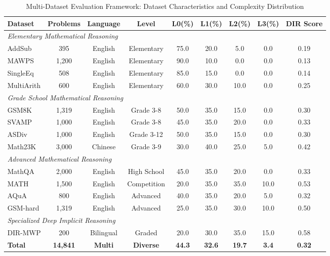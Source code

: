 \begin{table*}[htbp]
\caption{Multi-Dataset Evaluation Framework: Dataset Characteristics and Complexity Distribution}
\label{tab:dataset_framework}
\centering
\small
\begin{tabular}{lcccccccc}
\toprule
\textbf{Dataset} & \textbf{Problems} & \textbf{Language} & \textbf{Level} & \textbf{L0(\%)} & \textbf{L1(\%)} & \textbf{L2(\%)} & \textbf{L3(\%)} & \textbf{DIR Score} \\
\midrule
\multicolumn{9}{l}{\textit{Elementary Mathematical Reasoning}} \\
AddSub & 395 & English & Elementary & 75.0 & 20.0 & 5.0 & 0.0 & 0.19 \\
MAWPS & 1,200 & English & Elementary & 90.0 & 10.0 & 0.0 & 0.0 & 0.13 \\
SingleEq & 508 & English & Elementary & 85.0 & 15.0 & 0.0 & 0.0 & 0.14 \\
MultiArith & 600 & English & Elementary & 60.0 & 30.0 & 10.0 & 0.0 & 0.25 \\
\midrule
\multicolumn{9}{l}{\textit{Grade School Mathematical Reasoning}} \\
GSM8K & 1,319 & English & Grade 3-8 & 50.0 & 35.0 & 15.0 & 0.0 & 0.30 \\
SVAMP & 1,000 & English & Grade 3-8 & 45.0 & 35.0 & 20.0 & 0.0 & 0.33 \\
ASDiv & 1,000 & English & Grade 3-12 & 50.0 & 35.0 & 15.0 & 0.0 & 0.30 \\
Math23K & 3,000 & Chinese & Grade 3-9 & 30.0 & 40.0 & 25.0 & 5.0 & 0.42 \\
\midrule
\multicolumn{9}{l}{\textit{Advanced Mathematical Reasoning}} \\
MathQA & 2,000 & English & High School & 45.0 & 35.0 & 20.0 & 0.0 & 0.33 \\
MATH & 1,500 & English & Competition & 20.0 & 35.0 & 35.0 & 10.0 & 0.53 \\
AQuA & 800 & English & Advanced & 40.0 & 35.0 & 20.0 & 5.0 & 0.32 \\
GSM-hard & 1,319 & English & Advanced & 25.0 & 35.0 & 30.0 & 10.0 & 0.50 \\
\midrule
\multicolumn{9}{l}{\textit{Specialized Deep Implicit Reasoning}} \\
DIR-MWP & 200 & Bilingual & Graded & 20.0 & 30.0 & 35.0 & 15.0 & 0.58 \\
\midrule
\textbf{Total} & \textbf{14,841} & \textbf{Multi} & \textbf{Diverse} & \textbf{44.3} & \textbf{32.6} & \textbf{19.7} & \textbf{3.4} & \textbf{0.32} \\
\bottomrule
\end{tabular}
\end{table*}

